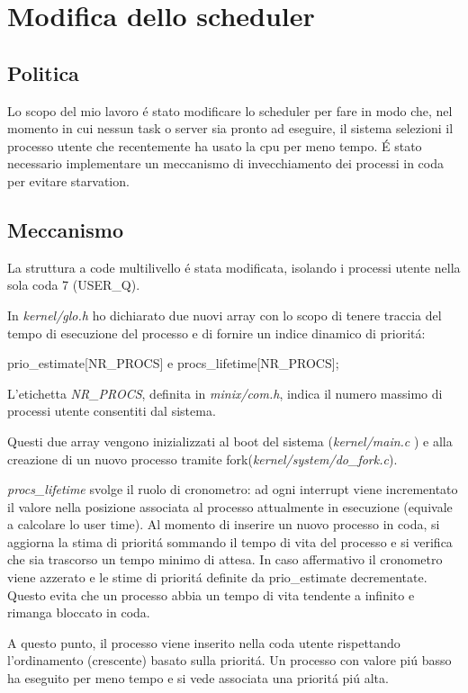 \documentclass[a4paper,12pt]{report}
\begin{document}
\chapter{Modifica dello scheduler}
\section{Politica}
Lo scopo del mio lavoro \'e stato modificare lo scheduler per fare in modo che, 
nel momento in cui nessun task o server sia pronto ad eseguire, il sistema selezioni
il processo utente che recentemente ha usato la cpu per meno tempo.
\'E stato necessario implementare un meccanismo di invecchiamento dei
processi in coda per evitare starvation.

\section{Meccanismo}
La struttura a code multilivello \'e stata modificata, isolando i processi
utente nella sola coda 7 (USER\_Q).

In \textit{kernel/glo.h} ho dichiarato due nuovi array con lo scopo di tenere
traccia del tempo di esecuzione del processo e di fornire un indice dinamico
di priorit\'a:
\begin{center}
        prio\_estimate[NR\_PROCS] e procs\_lifetime[NR\_PROCS];
\end{center}

L'etichetta \textit{NR\_PROCS}, definita in \textit{minix/com.h}, indica il numero 
massimo di processi utente consentiti dal sistema.

Questi due array vengono inizializzati al boot del sistema (\textit{kernel/main.c} ) e alla creazione
di un nuovo processo tramite fork(\textit{kernel/system/do\_fork.c}).

\textit{procs\_lifetime} svolge il ruolo di cronometro: 
ad ogni interrupt viene incrementato il valore nella posizione associata al processo
attualmente in esecuzione (equivale a calcolare lo user time). 
Al momento di inserire un nuovo processo in coda, si aggiorna la stima di
priorit\'a
sommando il tempo di vita del processo e si verifica che sia trascorso un 
tempo minimo di attesa. In caso affermativo
il cronometro viene azzerato e le stime di priorit\'a definite da
prio\_estimate decrementate.
Questo evita che un processo abbia un tempo di vita tendente a infinito e rimanga
bloccato in coda.

A questo punto, il processo viene inserito nella coda utente rispettando
l'ordinamento (crescente) basato sulla priorit\'a. Un processo con valore
pi\'u basso ha eseguito per meno tempo e si vede associata una priorit\'a
pi\'u alta.
\end{document}
